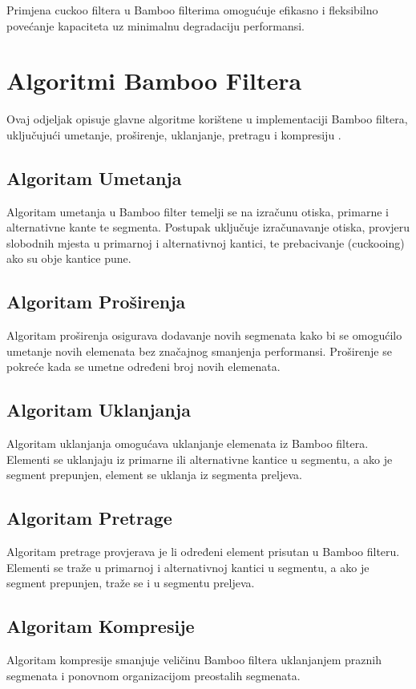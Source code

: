 \documentclass[seminarskirad]{fer}
\begin{document}
	Primjena cuckoo filtera u Bamboo filterima omogućuje efikasno i fleksibilno povećanje kapaciteta uz minimalnu degradaciju performansi.
	
	
	\section{Algoritmi Bamboo Filtera}
	Ovaj odjeljak opisuje glavne algoritme korištene u implementaciji Bamboo filtera, uključujući umetanje, proširenje, uklanjanje, pretragu i kompresiju \cite{wang2022bamboo}.
	
	\subsection{Algoritam Umetanja}
	Algoritam umetanja u Bamboo filter temelji se na izračunu otiska, primarne i alternativne kante te segmenta. Postupak uključuje izračunavanje otiska, provjeru slobodnih mjesta u primarnoj i alternativnoj kantici, te prebacivanje (cuckooing) ako su obje kantice pune.
	
	\subsection{Algoritam Proširenja}
	Algoritam proširenja osigurava dodavanje novih segmenata kako bi se omogućilo umetanje novih elemenata bez značajnog smanjenja performansi. Proširenje se pokreće kada se umetne određeni broj novih elemenata.
	
	\subsection{Algoritam Uklanjanja}
	Algoritam uklanjanja omogućava uklanjanje elemenata iz Bamboo filtera. Elementi se uklanjaju iz primarne ili alternativne kantice u segmentu, a ako je segment prepunjen, element se uklanja iz segmenta preljeva.
	
	\subsection{Algoritam Pretrage}
	Algoritam pretrage provjerava je li određeni element prisutan u Bamboo filteru. Elementi se traže u primarnoj i alternativnoj kantici u segmentu, a ako je segment prepunjen, traže se i u segmentu preljeva.
	
	\subsection{Algoritam Kompresije}
	Algoritam kompresije smanjuje veličinu Bamboo filtera uklanjanjem praznih segmenata i ponovnom organizacijom preostalih segmenata.
	
\end{document}
